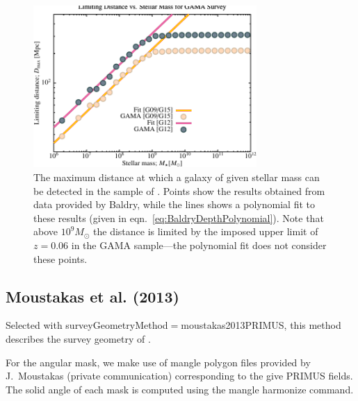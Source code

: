 \begin{figure}
 \begin{center}
 \includegraphics[width=85mm,trim=0mm 0mm 0mm 4mm,clip]{Plots/DataAnalysis/BaldryGAMAMassDistanceRelation.pdf}
 \end{center}
 \caption{The maximum distance at which a galaxy of given stellar mass can be detected in the sample of \protect\cite{baldry_galaxy_2012}. Points show the results obtained from data provided by Baldry, while the lines shows a polynomial fit to these results (given in eqn.~\ref{eq:BaldryDepthPolynomial}). Note that above $10^9M_\odot$ the distance is limited by the imposed upper limit of $z=0.06$ in the GAMA sample---the polynomial fit does not consider these points.}
 \label{fig:BaldryGAMADepthFit}
\end{figure}

\subsection{Moustakas et al. (2013)}\label{phys:surveyGeometry:surveyGeometryMoustakas2013PRIMUS}

Selected with {\normalfont \ttfamily surveyGeometryMethod}$=${\normalfont \ttfamily moustakas2013PRIMUS}, this method describes the survey geometry of \cite{moustakas_primus:_2013}. 

For the angular mask, we make use of \gls{mangle} polygon files provided by J.~Moustakas (private communication)  corresponding to the give PRIMUS fields. The solid angle of each mask is computed using the \gls{mangle} {\normalfont \ttfamily harmonize} command.

